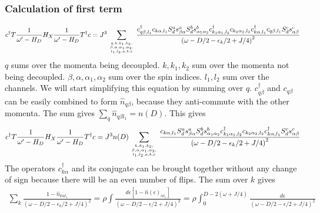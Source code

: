 \documentclass{revtex4-2}
\numberwithin{equation}{section}
\begin{document}
\subsubsection{Calculation of first term}
\begin{equation}\begin{aligned}
	c^\dagger T \frac{1}{\omega^\prime - H_D} H_X \frac{1}{\omega^\prime - H_D} T^\dagger c = J^3\sum_{q, k, k_1,k_2,\atop{\beta, \alpha, \alpha_1,\alpha_2,\atop{l_1,l_2,a,b,c}}} \frac{c^\dagger_{q\beta,l_1} c_{k\alpha,l_1} S_d^a s^a_{\beta \alpha} S_d^b s^b_{\alpha_1 \alpha_2} c^\dagger_{k_1\alpha_1,l_2}c_{k_2 \alpha_2,l_2} c^\dagger_{k\alpha, l_1} c_{q\beta, l_1} S_d^c s^c_{\alpha \beta}}{\left(\omega - D/2 -\epsilon_k/2 + J/4\right)^2}
\end{aligned}\end{equation}
\(q\) sums over the momenta being decoupled. \(k, k_1,k_2\) sum over the momenta not being decoupled. \(\beta, \alpha, \alpha_1,\alpha_2\) sum over the spin indices. \(l_1,l_2\) sum over the channels. We will start simplifying this equation by summing over \(q\). \(c^\dagger_{q\beta}\) and \(c_{q\beta}\) can be easily combined to form \(\hat n_{q\beta}\), because they anti-commute with the other momenta. The sum gives \(\sum_q \hat n_{q\beta l_1} = n(D) \). This gives
\begin{equation}\begin{aligned}
	c^\dagger T \frac{1}{\omega^\prime - H_D} H_X \frac{1}{\omega^\prime - H_D} T^\dagger c = J^3 n(D)\sum_{k, k_1,k_2,\atop{\beta, \alpha, \alpha_1,\alpha_2,\atop{l_1,l_2,a,b,c}}} \frac{c_{k\alpha,l_1} S_d^a s^a_{\beta \alpha} S_d^b s^b_{\alpha_1 \alpha_2} c^\dagger_{k_1\alpha_1,l_2}c_{k_2 \alpha_2,l_2} c^\dagger_{k\alpha, l_1} S_d^c s^c_{\alpha \beta}}{\left(\omega - D/2 -\epsilon_k/2 + J/4\right)^2}
\end{aligned}\end{equation}
The operators \(c^\dagger_{k\alpha}\) and its conjugate can be brought together without any change of sign because there will be an even number of flips. The sum over \(k\) gives
\begin{equation}\begin{aligned}
	\sum_k \frac{1 - \hat n_{k\alpha l_1}}{\left(\omega - D/2 -\epsilon_k/2 + J/4\right)^2} =  \rho\int \frac{d\epsilon\left[1 - \hat n(\epsilon)_{\alpha l_1}\right] }{\left(\omega - D/2 -\epsilon/2 + J/4\right)^2} = \rho\int_0^{D-2\left( \omega + J/4 \right) } \frac{d\epsilon}{\left(\omega - D/2 -\epsilon/2 + J/4\right)^2}
\end{aligned}\end{equation}
\end{document}
